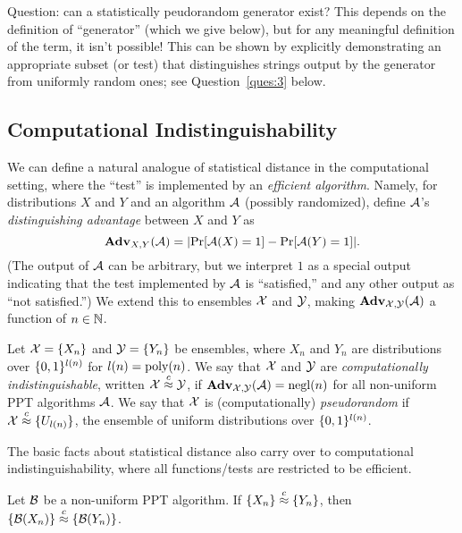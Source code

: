 \documentclass[11pt]{article}
\begin{document}
Question: can a statistically peudorandom generator exist?  This
depends on the definition of ``generator'' (which we give below), but
for any meaningful definition of the term, it isn't possible!  This
can be shown by explicitly demonstrating an appropriate subset (or
test) that distinguishes strings output by the generator from
uniformly random ones; see Question~\ref{ques:3} below.

\subsection{Computational Indistinguishability}
\label{sec:comp-indist}

We can define a natural analogue of statistical distance in the
computational setting, where the ``test'' is implemented by an
\emph{efficient algorithm}.  Namely, for distributions $X$ and $Y$ and
an algorithm $\mathcal{A}$ (possibly randomized), define $\mathcal{A}$'s
\emph{distinguishing advantage} between $X$ and $Y$ as
\[ \advan_{X,Y}(\Adv) = \abs*{\Pr[\Adv(X)=1] - \Pr[\Adv(Y)=1]}. \]
(The output of $\mathcal{A}$ can be arbitrary, but we interpret $1$ as a
special output indicating that the test implemented by $\mathcal{A}$ is
``satisfied,'' and any other output as ``not satisfied.'')  We extend
this to ensembles $\mathcal{X}$ and $\mathcal{Y}$, making
$\mathbf{Adv}_{\mathcal{X},\mathcal{Y}}(\mathcal{A})$ a function of $n \in \mathbb{N}$.

\begin{definition}
  \label{def:comp-ind}
  Let $\mathcal{X} = \{X_{n}\}$ and $\mathcal{Y} = \{Y_{n}\}$ be ensembles,
  where $X_{n}$ and $Y_{n}$ are distributions over $\{0,1\}^{l(n)}$ for
  $l(n) = \operatorname{poly}(n)$.  We say that $\mathcal{X}$ and $\mathcal{Y}$ are
  \emph{computationally indistinguishable}, written
  $\mathcal{X} \stackrel{c}{\approx} \mathcal{Y}$, if $\mathbf{Adv}_{\mathcal{X},\mathcal{Y}}(\mathcal{A}) = \operatorname{negl}(n)$
  for all non-uniform PPT algorithms $\mathcal{A}$.  We say that $\mathcal{X}$ is
  (computationally) \emph{pseudorandom} if
  $\mathcal{X} \stackrel{c}{\approx} \{U_{l(n)}\}$, the ensemble of uniform
  distributions over $\{0,1\}^{l(n)}$.
\end{definition}

The basic facts about statistical distance also carry over to
computational indistinguishability, where all functions/tests are
restricted to be efficient.

\begin{lemma}
  \label{lem:closure}
  Let $\mathcal{B}$ be a non-uniform PPT algorithm.  If
  $\{X_{n}\} \stackrel{c}{\approx} \{Y_{n}\}$, then
  $\{\mathcal{B}(X_{n})\} \stackrel{c}{\approx} \{\mathcal{B}(Y_{n})\}$.
\end{lemma}
\end{document}
